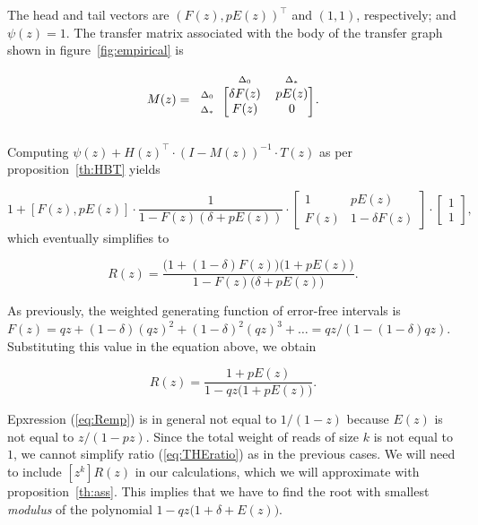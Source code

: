 \documentclass{article}
\newcommand{\smDELz}{\scriptstyle{\Delta_0}}
\newcommand{\smDELs}{\scriptstyle{\Delta_*}}
\begin{document}
The head and tail vectors are $(F(z), pE(z))^\top$ and $(1,1)$,
respectively; and $\psi(z) = 1$. The transfer matrix associated with the
body of the transfer graph shown in figure~\ref{fig:empirical} is

\begin{equation*}
M(z) = 
\begin{blockarray}{ccc}
       & \smDELz & \smDELs \\
\begin{block}{c[cc]}
\smDELz & \delta F(z)  & p E(z) \\
\smDELs & F(z)         &   0    \\
\end{block}
\end{blockarray}.
\end{equation*}


Computing $\psi(z) + H(z)^\top \cdot (I-M(z))^{-1} \cdot T(z)$ as per
proposition~\ref{th:HBT} yields

\begin{equation*}
1+[F(z), pE(z)] \cdot \frac{1}{1-F(z)(\delta+pE(z))} \cdot
\begin{bmatrix}
1    & pE(z) \\
F(z) & 1-\delta F(z)
\end{bmatrix} \cdot
\begin{bmatrix}1 \\ 1\end{bmatrix},
\end{equation*}
which eventually simplifies to

\begin{equation}
\label{eq:Remp0}
R(z) = 
\frac{\big(1+(1-\delta)F(z)\big)\big(1+pE(z)\big)}
   {1-F(z)\big(\delta+pE(z)\big)}.
\end{equation}

As previously, the weighted generating function of error-free intervals is
$F(z) = qz + (1-\delta)(qz)^2 + (1-\delta)^2(qz)^3 + \ldots =
qz/(1-(1-\delta)qz)$. Substituting this value in the equation above, we
obtain

\begin{equation}
\label{eq:Remp}
R(z) = \frac{1+pE(z)}{1-qz\big(1+pE(z)\big)}.
\end{equation}

Epxression (\ref{eq:Remp}) is in general not equal to $1/(1-z)$ because
$E(z)$ is not equal to $z/(1-pz)$. Since the total weight of reads of size
$k$ is not equal to $1$, we cannot simplify ratio (\ref{eq:THEratio}) as
in the previous cases. We will need to include $[z^k]R(z)$ in our
calculations, which we will approximate with proposition~\ref{th:ass}.
This implies that we have to find the root with smallest \textit{modulus}
of the polynomial $1-qz\big(1+\delta+E(z)\big)$.
\end{document}
